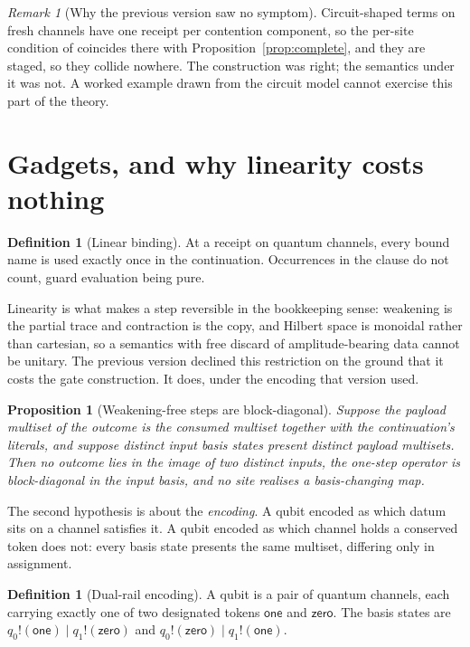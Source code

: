 \documentclass[11pt,a4paper]{article}
\theoremstyle{plain}
\newtheorem{proposition}[theorem]{Proposition}
\theoremstyle{definition}
\newtheorem{definition}[theorem]{Definition}
\theoremstyle{remark}
\newtheorem{remark}[theorem]{Remark}
\begin{document}
\begin{remark}[Why the previous version saw no symptom]\label{rem:blind}
Circuit-shaped terms on fresh channels have one receipt per contention
component, so the per-site condition of \cite{GWv4} coincides there with
Proposition~\ref{prop:complete}, and they are staged, so they collide nowhere.
The construction was right; the semantics under it was not. A worked example
drawn from the circuit model cannot exercise this part of the theory.
\end{remark}

\section{Gadgets, and why linearity costs nothing}\label{sec:gadgets}

\begin{definition}[Linear binding]\label{def:linear}
At a receipt on quantum channels, every bound name is used exactly once in the
continuation. Occurrences in the clause do not count, guard evaluation being
pure.
\end{definition}

Linearity is what makes a step reversible in the bookkeeping sense: weakening is
the partial trace and contraction is the copy, and Hilbert space is monoidal
rather than cartesian, so a semantics with free discard of amplitude-bearing
data cannot be unitary. The previous version declined this restriction on the
ground that it costs the gate construction. It does, under the encoding that
version used.

\begin{proposition}[Weakening-free steps are block-diagonal]\label{prop:blockdiag}
Suppose the payload multiset of the outcome is the consumed multiset together
with the continuation's literals, and suppose distinct input basis states
present distinct payload multisets. Then no outcome lies in the image of two
distinct inputs, the one-step operator is block-diagonal in the input basis, and
no site realises a basis-changing map.
\end{proposition}

The second hypothesis is about the \emph{encoding}. A qubit encoded as which
datum sits on a channel satisfies it. A qubit encoded as which channel holds a
conserved token does not: every basis state presents the same multiset,
differing only in assignment.

\begin{definition}[Dual-rail encoding]\label{def:wire}
A qubit is a pair of quantum channels, each carrying exactly one of two
designated tokens $\mathsf{one}$ and $\mathsf{zero}$. The basis states are
$q_0!(\mathsf{one}) \mid q_1!(\mathsf{zero})$ and
$q_0!(\mathsf{zero}) \mid q_1!(\mathsf{one})$.
\end{definition}
\end{document}
